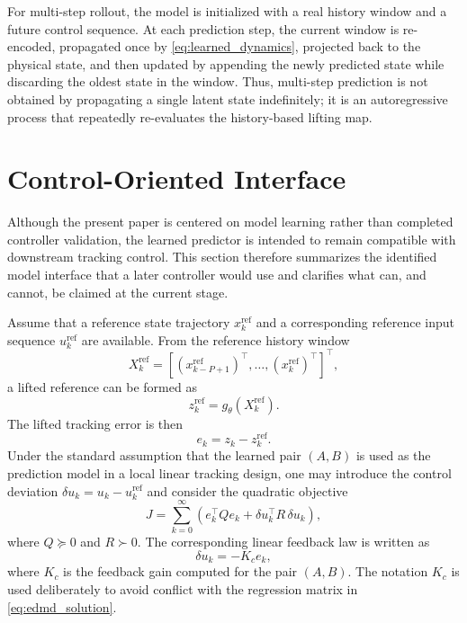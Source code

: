 \documentclass[journal]{IEEEtran}
\begin{document}
For multi-step rollout, the model is initialized with a real history window and a future control sequence. At each prediction step, the current window is re-encoded, propagated once by \eqref{eq:learned_dynamics}, projected back to the physical state, and then updated by appending the newly predicted state while discarding the oldest state in the window. Thus, multi-step prediction is not obtained by propagating a single latent state indefinitely; it is an autoregressive process that repeatedly re-evaluates the history-based lifting map.

\section{Control-Oriented Interface}
\label{sec:control}

Although the present paper is centered on model learning rather than completed controller validation, the learned predictor is intended to remain compatible with downstream tracking control. This section therefore summarizes the identified model interface that a later controller would use and clarifies what can, and cannot, be claimed at the current stage.

Assume that a reference state trajectory $x_k^{\mathrm{ref}}$ and a corresponding reference input sequence $u_k^{\mathrm{ref}}$ are available. From the reference history window
\begin{equation}
    X_k^{\mathrm{ref}} = [(x_{k-P+1}^{\mathrm{ref}})^\top,\ldots,(x_k^{\mathrm{ref}})^\top]^\top,
\end{equation}
a lifted reference can be formed as
\begin{equation}
    z_k^{\mathrm{ref}} = g_\theta(X_k^{\mathrm{ref}}).
    \label{eq:reference_lifting}
\end{equation}
The lifted tracking error is then
\begin{equation}
    e_k = z_k - z_k^{\mathrm{ref}}.
    \label{eq:tracking_error}
\end{equation}
Under the standard assumption that the learned pair $(A,B)$ is used as the prediction model in a local linear tracking design, one may introduce the control deviation $\delta u_k=u_k-u_k^{\mathrm{ref}}$ and consider the quadratic objective
\begin{equation}
    J = \sum_{k=0}^{\infty}
    \left(e_k^\top Q e_k + \delta u_k^\top R\,\delta u_k\right),
    \label{eq:lqr_objective}
\end{equation}
where $Q\succeq 0$ and $R\succ 0$. The corresponding linear feedback law is written as
\begin{equation}
    \delta u_k = -K_c e_k,
    \label{eq:lqr_control}
\end{equation}
where $K_c$ is the feedback gain computed for the pair $(A,B)$. The notation $K_c$ is used deliberately to avoid conflict with the regression matrix in \eqref{eq:edmd_solution}.
\end{document}

